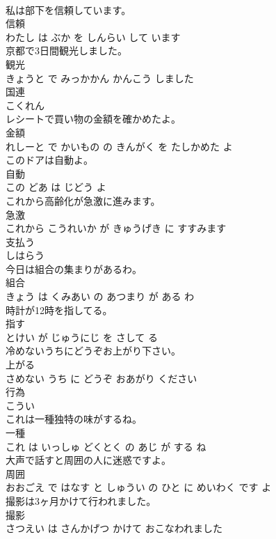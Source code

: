 \documentclass[8pt]{extreport}
\begin{document}
\begin{CJK}{UTF8}{min}
\\	私は部下を信頼しています。	
\\	信頼 
\\	わたし は ぶか を しんらい して います		
\\	京都で3日間観光しました。	
\\	観光 
\\	きょうと で みっかかん かんこう しました		
\\	国連	
\\	こくれん		
\\	レシートで買い物の金額を確かめたよ。	
\\	金額 
\\	れしーと で かいもの の きんがく を たしかめた よ		
\\	このドアは自動よ。	
\\	自動 
\\	この どあ は じどう よ		
\\	これから高齢化が急激に進みます。	
\\	急激 
\\	これから こうれいか が きゅうげき に すすみます		
\\	支払う	
\\	しはらう		
\\	今日は組合の集まりがあるわ。	
\\	組合 
\\	きょう は くみあい の あつまり が ある わ		
\\	時計が12時を指してる。	
\\	指す 
\\	とけい が じゅうにじ を さして る		
\\	冷めないうちにどうぞお上がり下さい。	
\\	上がる 
\\	さめない うち に どうぞ おあがり ください		
\\	行為	
\\	こうい		
\\	これは一種独特の味がするね。	
\\	一種 
\\	これ は いっしゅ どくとく の あじ が する ね		
\\	大声で話すと周囲の人に迷惑ですよ。	
\\	周囲 
\\	おおごえ で はなす と しゅうい の ひと に めいわく です よ		
\\	撮影は3ヶ月かけて行われました。	
\\	撮影 
\\	さつえい は さんかげつ かけて おこなわれました		

\end{CJK}
\end{document}
